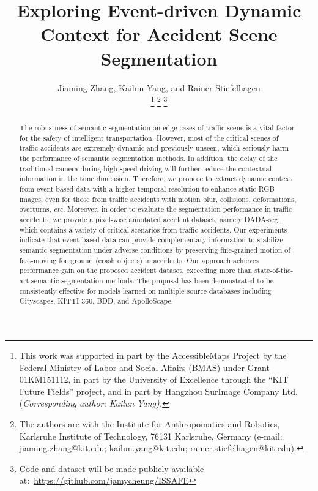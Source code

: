\documentclass[journal]{IEEEtran}
\begin{document}
\title{Exploring Event-driven Dynamic Context for Accident Scene Segmentation}
\author{Jiaming Zhang, Kailun Yang, and Rainer Stiefelhagen

\thanks{This work was supported in part by the AccessibleMaps Project by the Federal Ministry of Labor and Social Affairs (BMAS) under Grant 01KM151112, in part by the University of Excellence through the “KIT Future Fields” project, and in part by Hangzhou SurImage Company Ltd.  (\textit{Corresponding author: Kailun Yang).}}
\thanks{The authors are with the Institute for Anthropomatics and Robotics, Karlsruhe Institute of Technology, 76131 Karlsruhe, Germany (e-mail: jiaming.zhang@kit.edu; kailun.yang@kit.edu; rainer.stiefelhagen@kit.edu).}
\thanks{{Code and dataset will be made publicly available at:~\url{https://github.com/jamycheung/ISSAFE}}}
}
\maketitle

\begin{abstract}
The robustness of semantic segmentation on edge cases of traffic scene is a vital factor for the safety of intelligent transportation. However, most of the critical scenes of traffic accidents are extremely dynamic and previously unseen, which seriously harm the performance of semantic segmentation methods. In addition, the delay of the traditional camera during high-speed driving will further reduce the contextual information in the time dimension. Therefore, we propose to extract dynamic context from event-based data with a higher temporal resolution to enhance static RGB images, even for those from traffic accidents with motion blur, collisions, deformations, overturns, \textit{etc.} Moreover, in order to evaluate the segmentation performance in traffic accidents, we provide a pixel-wise annotated accident dataset, namely DADA-seg, which contains a variety of critical scenarios from traffic accidents. Our experiments indicate that event-based data can provide complementary information to stabilize semantic segmentation under adverse conditions by preserving fine-grained motion of fast-moving foreground (crash objects) in accidents. Our approach achieves  performance gain on the proposed accident dataset, exceeding more than  state-of-the-art semantic segmentation methods. The proposal has been demonstrated to be consistently effective for models learned on multiple source databases including Cityscapes, KITTI-360, BDD, and ApolloScape. 

\end{abstract}
\end{document}
